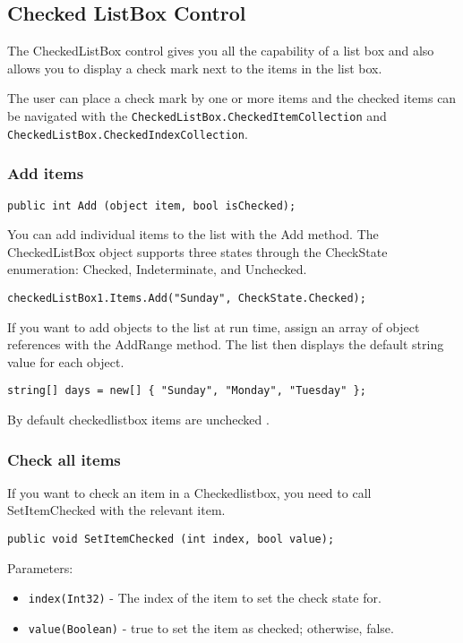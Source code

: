 \subsection*{Checked ListBox Control}
The CheckedListBox control gives you all the capability of a list box and also allows you to display a check mark next to the items in the list box.

The user can place a check mark by one or more items and the checked items can be navigated with the \texttt{CheckedListBox.CheckedItemCollection} and \texttt{CheckedListBox.CheckedIndexCollection}.

\subsubsection*{Add items}

\begin{lstlisting}[numbers=none]
	public int Add (object item, bool isChecked);
\end{lstlisting}

You can add individual items to the list with the Add method. The CheckedListBox object supports three states through the CheckState enumeration: Checked, Indeterminate, and Unchecked.

\begin{lstlisting}[numbers=none]
	checkedListBox1.Items.Add("Sunday", CheckState.Checked);
\end{lstlisting}

If you want to add objects to the list at run time, assign an array of object references with the AddRange method. The list then displays the default string value for each object.

\begin{lstlisting}[numbers=none]
	string[] days = new[] { "Sunday", "Monday", "Tuesday" };
\end{lstlisting}
By default checkedlistbox items are unchecked .

\subsubsection*{Check all items}
If you want to check an item in a Checkedlistbox, you need to call SetItemChecked with the relevant item.

\begin{lstlisting}[numbers=none]
	public void SetItemChecked (int index, bool value);
\end{lstlisting}

Parameters:
\begin{itemize}
	\item \verb*|index(Int32)| - The index of the item to set the check state for.
	\item \verb*|value(Boolean)| - true to set the item as checked; otherwise, false.
\end{itemize}



